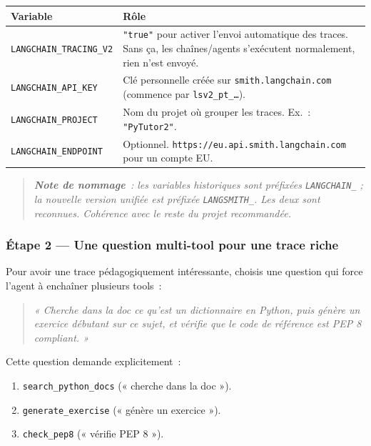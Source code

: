 \documentclass[11pt,a4paper]{article}
\begin{document}
\begin{center}
\begin{tabular}{p{5cm} p{9cm}}
\toprule
\textbf{Variable} & \textbf{Rôle} \\
\midrule
\texttt{LANGCHAIN\_TRACING\_V2}
& \texttt{"true"} pour activer l'envoi automatique des traces. Sans ça,
les chaînes/agents s'exécutent normalement, rien n'est envoyé. \\[1mm]
\texttt{LANGCHAIN\_API\_KEY}
& Clé personnelle créée sur \texttt{smith.langchain.com} (commence par
\texttt{lsv2\_pt\_\dots}). \\[1mm]
\texttt{LANGCHAIN\_PROJECT}
& Nom du projet où grouper les traces. Ex.~: \texttt{"PyTutor2"}. \\[1mm]
\texttt{LANGCHAIN\_ENDPOINT} & Optionnel.
\texttt{https://eu.api.smith.langchain.com} pour un compte EU. \\
\bottomrule
\end{tabular}
\end{center}

\begin{quote}\itshape
\textbf{Note de nommage}~: les variables historiques sont préfixées
\texttt{LANGCHAIN\_} ; la nouvelle version unifiée est préfixée
\texttt{LANGSMITH\_}. Les deux sont reconnues. Cohérence avec le reste
du projet recommandée.
\end{quote}

\subsubsection*{Étape 2 — Une question \textbf{multi-tool} pour une trace riche}

Pour avoir une trace pédagogiquement intéressante, choisis une question
qui force l'agent à enchaîner plusieurs tools~:

\begin{quote}\itshape
\emph{« Cherche dans la doc ce qu'est un dictionnaire en Python, puis
génère un exercice débutant sur ce sujet, et vérifie que le code de
référence est PEP 8 compliant. »}
\end{quote}

Cette question demande explicitement~:
\begin{enumerate}[leftmargin=*]
  \item \texttt{search\_python\_docs} (« cherche dans la doc »).
  \item \texttt{generate\_exercise} (« génère un exercice »).
  \item \texttt{check\_pep8} (« vérifie PEP 8 »).
\end{enumerate}
\end{document}
